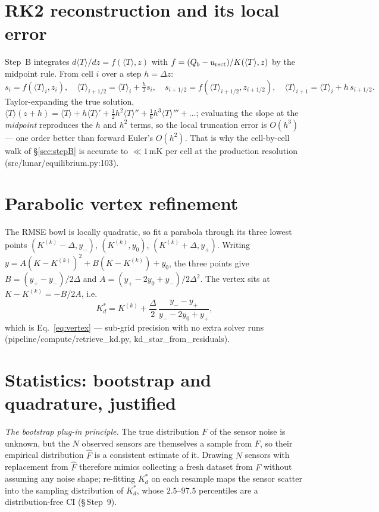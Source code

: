 \documentclass[11pt]{report}
\newcommand{\Tm}{\langle T\rangle}
\newcommand{\code}[1]{{\ttfamily\small #1}}
\begin{document}
\section{RK2 reconstruction and its local error}\label{app:rk2}
Step~B integrates $d\Tm/dz=f(\Tm,z)$ with $f=(Q_b-u_{\rm rect})/K(\Tm,z)$ by the
midpoint rule. From cell $i$ over a step $h=\Delta z$:
\[
s_i=f(\Tm_i,z_i),\quad
\Tm_{i+1/2}=\Tm_i+\tfrac{h}{2}s_i,\quad
s_{i+1/2}=f(\Tm_{i+1/2},z_{i+1/2}),\quad
\Tm_{i+1}=\Tm_i+h\,s_{i+1/2}.
\]
Taylor-expanding the true solution, $\Tm(z+h)=\Tm+h\Tm'+\tfrac12h^2\Tm''
+\tfrac16h^3\Tm'''+\dots$; evaluating the slope at the \emph{midpoint} reproduces
the $h$ and $h^2$ terms, so the local truncation error is $O(h^3)$ --- one order
better than forward Euler's $O(h^2)$. That is why the cell-by-cell walk of
\S\ref{sec:stepB} is accurate to $\ll1$\,mK per cell at the production resolution
(\code{src/lunar/equilibrium.py:103}).

\section{Parabolic vertex refinement}\label{app:vertex}
The RMSE bowl is locally quadratic, so fit a parabola through its three lowest
points $(K^{(k)}{-}\Delta,y_-)$, $(K^{(k)},y_0)$, $(K^{(k)}{+}\Delta,y_+)$. Writing
$y=A(K-K^{(k)})^2+B(K-K^{(k)})+y_0$, the three points give
$B=(y_+-y_-)/2\Delta$ and $A=(y_+-2y_0+y_-)/2\Delta^2$. The vertex sits at
$K-K^{(k)}=-B/2A$, i.e.
\[
\boxed{\;K_d^{*}=K^{(k)}+\frac{\Delta}{2}\,\frac{y_--y_+}{y_--2y_0+y_+},\;}
\]
which is Eq.~\eqref{eq:vertex} --- sub-grid precision with no extra solver runs
(\code{pipeline/compute/retrieve\_kd.py}, \code{kd\_star\_from\_residuals}).

\section{Statistics: bootstrap and quadrature, justified}\label{app:stats}
\emph{The bootstrap plug-in principle.} The true distribution $F$ of the
sensor noise is unknown, but the $N$ observed sensors are themselves a sample from
$F$, so their empirical distribution $\widehat F$ is a consistent estimate of it.
Drawing $N$ sensors with replacement from $\widehat F$ therefore mimics
collecting a fresh dataset from $F$ without assuming any noise shape; re-fitting
$K_d^{*}$ on each resample maps the sensor scatter into the sampling distribution
of $K_d^{*}$, whose $2.5$--$97.5$ percentiles are a distribution-free CI
(\S\,Step~9).
\end{document}
